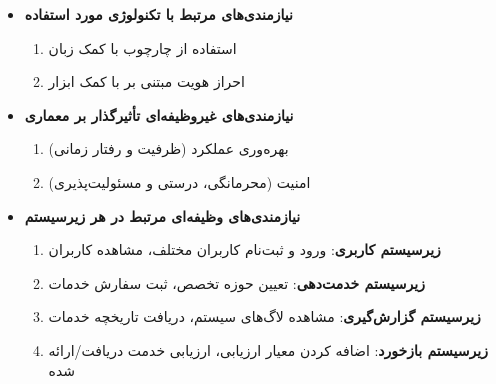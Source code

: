 \begin{itemize}
	\item \textbf{نیازمندی‌های مرتبط با تکنولوژی مورد استفاده}
		\begin{enumerate}
			\item
			استفاده از چارچوب  با کمک زبان 
			\item
			احراز هویت مبتنی بر  با کمک ابزار 
		\end{enumerate}
	
	\item \textbf{نیازمندی‌های غیروظیفه‌ای تأثیرگذار بر معماری}
		\begin{enumerate}
			\item
			بهره‌وری عملکرد (ظرفیت و رفتار زمانی)
			\item
			امنیت (محرمانگی، درستی و مسئولیت‌پذیری)
		\end{enumerate}
	
	\item \textbf{نیازمندی‌های وظیفه‌ای مرتبط در هر زیرسیستم}
		\begin{enumerate}
			\item \textbf{زیرسیستم کاربری}:
			ورود و ثبت‌نام کاربران مختلف، مشاهده کاربران
			\item \textbf{زیرسیستم خدمت‌دهی}:
			تعیین حوزه تخصص، ثبت سفارش خدمات
			\item \textbf{زیرسیستم گزارش‌گیری}:
			مشاهده لاگ‌های سیستم، دریافت تاریخچه خدمات
			\item \textbf{زیرسیستم بازخورد}:
			اضافه کردن معیار ارزیابی، ارزیابی خدمت دریافت/ارائه شده
		\end{enumerate}
\end{itemize}



